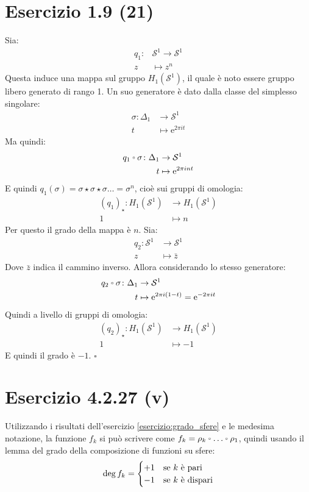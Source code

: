 \documentclass[10pt]{scrartcl}
\newcommand{\Sph}[1][]{\mathcal{S}^#1}
\let\latexcirc=\circ
\newcommand{\ccirc}{\mathbin{\mathchoice
  {\xcirc\scriptstyle}
  {\xcirc\scriptstyle}
  {\xcirc\scriptscriptstyle}
  {\xcirc\scriptscriptstyle}
}}
\newcommand{\xcirc}[1]{\vcenter{\hbox{$#1\latexcirc$}}}
\let\circ\ccirc
\begin{document}
\section{Esercizio 1.9 (21)}
Sia:
\begin{align*}
  q_1 \colon & \Sph{1} \to \Sph{1} \\
  z & \mapsto z^n
\end{align*}
Questa induce una mappa sul gruppo $ H_1(\Sph{1}) $,
il quale è noto essere gruppo libero generato di rango 1.
Un suo generatore è dato dalla classe del simplesso
singolare:
\begin{align*}
  \sigma \colon \Delta_1 & \to \Sph{1} \\
  t & \mapsto \mathrm{e}^{2 \pi i t}
\end{align*}
Ma quindi:
\begin{align*}
  q_1 \circ \sigma \colon \Delta_1 & \to \Sph{1} \\
  t & \mapsto \mathrm{e}^{2 \pi i n t}
\end{align*}
E quindi $ q_1(\sigma) = \sigma \star \sigma \star \sigma \dots = \sigma^n $, cioè sui gruppi
di omologia:
\begin{align*}
  (q_1)_\star \colon H_1(\Sph{1}) & \to H_1(\Sph{1}) \\
  1 & \mapsto n
\end{align*}
Per questo il grado della mappa è $ n $.
Sia:
\begin{align*}
  q_2 \colon  \Sph{1} & \to \Sph{1} \\
  z & \mapsto \bar{z}
\end{align*}
Dove $ \bar{z} $ indica il cammino inverso. Allora
considerando lo stesso generatore:
\begin{align*}
  q_2 \circ \sigma \colon  \Delta_1 & \to \Sph{1} \\
  t & \mapsto \mathrm{e}^{2 \pi i (1 - t)} = \mathrm{e}^{-2 \pi i t}
\end{align*}
Quindi a livello di gruppi di omologia:
\begin{align*}
  (q_2)_\star \colon H_1(\Sph{1}) & \to H_1(\Sph{1}) \\
  1 & \mapsto -1
\end{align*}
E quindi il grado è $ -1 $.
\hfill $ \square $

\section{Esercizio 4.2.27 (v)}

Utilizzando i risultati dell'esercizio \ref{esercizio:grado_sfere}
e le medesima notazione, la funzione $ f_k $ si può scrivere come
$ f_k = \rho_k \circ \dots \circ \rho_1 $, quindi usando il lemma del grado della
composizione di funzioni su sfere:
\[
  \deg {f_k} =
  \begin{cases}
    + 1 & \text{se $ k $ è pari} \\
    - 1 & \text{se $ k $ è dispari}
  \end{cases}
\]
\end{document}
